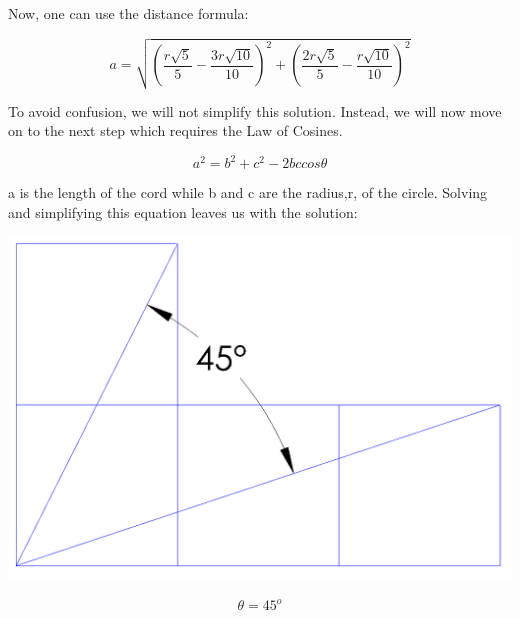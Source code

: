 \documentclass{article}
\begin{document}
Now, one can use the distance formula:

$$ a=\sqrt{(\frac{ r\sqrt{5} }{5}-\frac{3r\sqrt{10}}{10})^2 + (\frac{ 2r\sqrt{5} }{5}-\frac{r\sqrt{10}}{10})^2}$$


To avoid confusion, we will not simplify this solution. Instead, we will now move on to the next step which requires the Law of Cosines.

$$ a^2=b^2+c^2-2bccos\theta$$

\pagebreak

a is the length of the cord while b and c are the radius,r, of the circle. Solving and simplifying this equation leaves us with the solution:
 \begin{center}

\includegraphics[width=.8\linewidth]{solution.png}
 \end{center}

$$\theta=45^o$$
\end{document}
